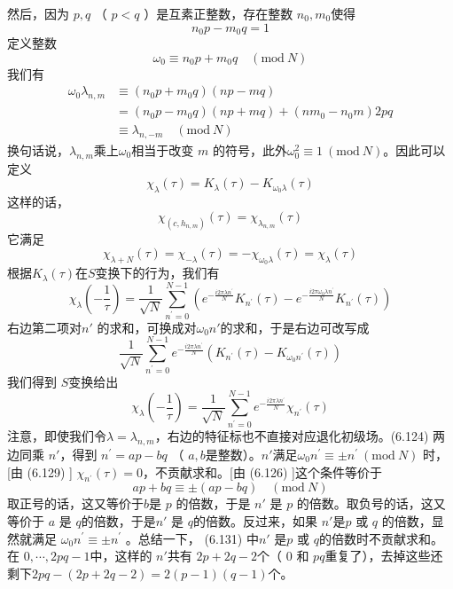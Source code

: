 然后，因为 $p,q$ （ $p<q$ ）是互素正整数，存在整数 $n_0,m_0 $使得
\begin{equation}
n_{0} p-m_{0} q=1	
\end{equation}
定义整数
\begin{equation}
	\omega_{0} \equiv n_{0} p+m_{0} q \quad(\text{mod}\ N)
\end{equation}
我们有
\begin{equation}
	\begin{aligned} \omega_{0} \lambda_{n, m} & \equiv\left(n_{0} p+m_{0} q\right)(n p-m q) \\ &=\left(n_{0} p-m_{0} q\right)(n p +m q)+\left(n m_{0}-n_{0} m\right) 2 p q \\ & \equiv \lambda_{n,-m} \quad(\text{mod} \ N) \end{aligned} 
\end{equation}
换句话说，$ \lambda_{n, m} $乘上$ \omega_0 $相当于改变 $m$ 的符号，此外$ \omega_{0}^{2} \equiv 1\ (\text{mod}\ N) $。因此可以定义
\begin{equation}
	\chi_{\lambda}(\tau)=K_{\lambda}(\tau)-K_{\omega_{0} \lambda}(\tau)
\end{equation} 
这样的话，
\begin{equation}
	\chi_{\left(c, h_{n, m}\right)}(\tau)=\chi_{\lambda_{n, m}}(\tau) 
\end{equation}
它满足
\begin{equation}
	\chi_{\lambda+N}(\tau)=\chi_{-\lambda}(\tau)=-\chi_{\omega_{0} \lambda}(\tau)=\chi_{\lambda}(\tau) 
\end{equation}
根据$ K_{\lambda}(\tau) $在$ S $变换下的行为，我们有
\begin{equation}
	\chi_{\lambda}\left(-\frac{1}{\tau}\right)=\frac{1}{\sqrt{N}} \sum_{n^{\prime}=0}^{N-1}\left(e^{-\frac{i 2 \pi \lambda n^{\prime}}{N}} K_{n^{\prime}}(\tau)-e^{-\frac{i 2 \pi \omega_{0} \lambda n^{\prime}}{N}} K_{n^{\prime}}(\tau)\right)
\end{equation} 
右边第二项对$ n'$ 的求和，可换成对$ \omega_0n' $的求和，于是右边可改写成
$$
\frac{1}{\sqrt{N}} \sum_{n^{\prime}=0}^{N-1} e^{-\frac{i 2 \pi \lambda n^{\prime}}{N}}\left(K_{n^{\prime}}(\tau)-K_{\omega_{0} n^{\prime}}(\tau)\right)
$$
我们得到 $S $变换给出
\begin{equation}
	\chi_{\lambda}\left(-\frac{1}{\tau}\right)=\frac{1}{\sqrt{N}} \sum_{n^{\prime}=0}^{N-1} e^{-\frac{i 2 \pi \lambda n^{\prime}}{N}} \chi_{n^{\prime}}(\tau)
\end{equation} 
注意，即使我们令$ \lambda=\lambda_{n, m} $，右边的特征标也不直接对应退化初级场。(6.124) 两边同乘 $n' $，得到 $n^{\prime}=a p-b q$ （ $a,b $是整数）。$ n' $满足$ \omega_{0} n^{\prime} \equiv \pm n^{\prime}\ (\text{mod}\ N)$ 时，[由 (6.129) ] $\chi_{n^{\prime}}(\tau) =0 $，不贡献求和。[由 (6.126) ]这个条件等价于
$$
a p+b q \equiv \pm(a p-b q) \quad(\text{mod}\ N)
$$
取正号的话，这又等价于$ b $是 $p$ 的倍数，于是 $n'$ 是 $p$ 的倍数。取负号的话，这又等价于 $a$ 是 $q $的倍数，于是$ n'$ 是 $q $的倍数。反过来，如果 $n' $是$ p$ 或 $q$ 的倍数，显然就满足 $\omega_{0} n^{\prime} \equiv \pm n^{\prime}$ 。总结一下， (6.131) 中$ n'$ 是$ p$ 或 $q $的倍数时不贡献求和。在 $0, \cdots, 2 p q-1 $中，这样的 $n' $共有 $2p+2q-2 $个（ $0$ 和 $p q $重复了），去掉这些还剩下$2 p q-(2 p+2 q-2)=2(p-1)(q-1) $个。

